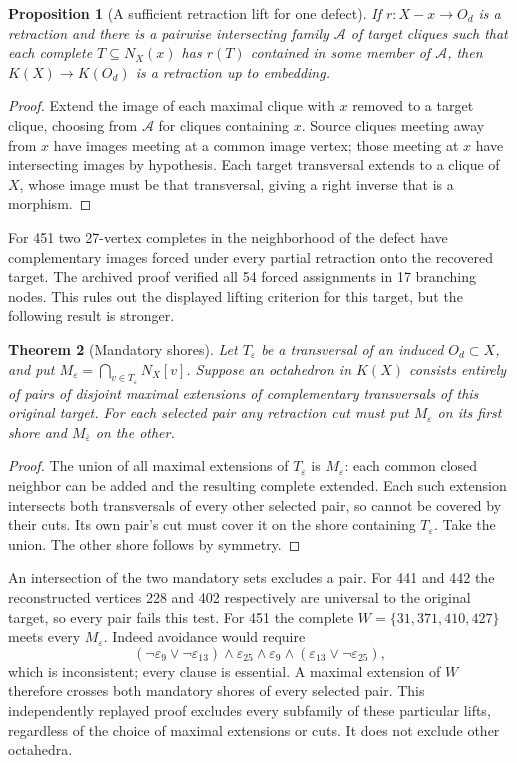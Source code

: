 \documentclass[11pt,a4paper]{article}
\newtheorem{theorem}{Theorem}[section]
\newtheorem{proposition}[theorem]{Proposition}
\theoremstyle{definition}\newtheorem{definition}[theorem]{Definition}\newtheorem{example}[theorem]{Example}
\theoremstyle{remark}\newtheorem{remark}[theorem]{Remark}
\begin{document}
\begin{proposition}[A sufficient retraction lift for one defect]
If \(r:X-x\to O_d\) is a retraction and there is a pairwise intersecting family \(\mathcal A\) of target cliques such that each complete \(T\subseteq N_X(x)\) has \(r(T)\) contained in some member of \(\mathcal A\), then \(K(X)\to K(O_d)\) is a retraction up to embedding.
\end{proposition}
\begin{proof}
Extend the image of each maximal clique with \(x\) removed to a target clique, choosing from \(\mathcal A\) for cliques containing \(x\). Source cliques meeting away from \(x\) have images meeting at a common image vertex; those meeting at \(x\) have intersecting images by hypothesis. Each target transversal extends to a clique of \(X\), whose image must be that transversal, giving a right inverse that is a morphism.
\end{proof}
For 451 two 27-vertex completes in the neighborhood of the defect have complementary images forced under every partial retraction onto the recovered target. The archived proof verified all 54 forced assignments in 17 branching nodes. This rules out the displayed lifting criterion for this target, but the following result is stronger.

\begin{theorem}[Mandatory shores]\label{thm:mandatory}
Let \(T_\varepsilon\) be a transversal of an induced \(O_d\subset X\), and put \(M_\varepsilon=\bigcap_{v\in T_\varepsilon}N_X[v]\). Suppose an octahedron in \(K(X)\) consists entirely of pairs of disjoint maximal extensions of complementary transversals of this original target. For each selected pair any retraction cut must put \(M_\varepsilon\) on its first shore and \(M_{\bar\varepsilon}\) on the other.
\end{theorem}
\begin{proof}
The union of all maximal extensions of \(T_\varepsilon\) is \(M_\varepsilon\): each common closed neighbor can be added and the resulting complete extended. Each such extension intersects both transversals of every other selected pair, so cannot be covered by their cuts. Its own pair's cut must cover it on the shore containing \(T_\varepsilon\). Take the union. The other shore follows by symmetry.
\end{proof}
An intersection of the two mandatory sets excludes a pair. For 441 and 442 the reconstructed vertices 228 and 402 respectively are universal to the original target, so every pair fails this test. For 451 the complete \(W=\{31,371,410,427\}\) meets every \(M_\varepsilon\). Indeed avoidance would require
\[
 (\neg\varepsilon_9\lor\neg\varepsilon_{13})\land\varepsilon_{25}
 \land\varepsilon_9\land(\varepsilon_{13}\lor\neg\varepsilon_{25}),
\]
which is inconsistent; every clause is essential. A maximal extension of \(W\) therefore crosses both mandatory shores of every selected pair. This independently replayed proof excludes every subfamily of these particular lifts, regardless of the choice of maximal extensions or cuts. It does not exclude other octahedra.
\end{document}
